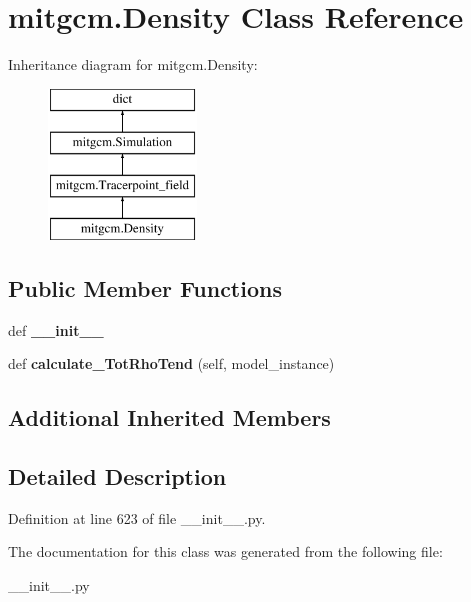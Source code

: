 \hypertarget{classmitgcm_1_1Density}{}\section{mitgcm.\+Density Class Reference}
\label{classmitgcm_1_1Density}
Inheritance diagram for mitgcm.\+Density\+:\begin{figure}[H]
\begin{center}
\leavevmode
\includegraphics[height=4.000000cm]{classmitgcm_1_1Density}
\end{center}
\end{figure}
\subsection*{Public Member Functions}
\begin{DoxyCompactItemize}
\item 
\hypertarget{classmitgcm_1_1Density_aebdb54f40c181a305136c8d877c188d1}{}def {\bfseries \+\_\+\+\_\+init\+\_\+\+\_\+}\label{classmitgcm_1_1Density_aebdb54f40c181a305136c8d877c188d1}

\item 
\hypertarget{classmitgcm_1_1Density_a97c24db957a94e9a7a6968626771b9b3}{}def {\bfseries calculate\+\_\+\+Tot\+Rho\+Tend} (self, model\+\_\+instance)\label{classmitgcm_1_1Density_a97c24db957a94e9a7a6968626771b9b3}

\end{DoxyCompactItemize}
\subsection*{Additional Inherited Members}


\subsection{Detailed Description}


Definition at line 623 of file \+\_\+\+\_\+init\+\_\+\+\_\+.\+py.



The documentation for this class was generated from the following file\+:\begin{DoxyCompactItemize}
\item 
\+\_\+\+\_\+init\+\_\+\+\_\+.\+py\end{DoxyCompactItemize}
